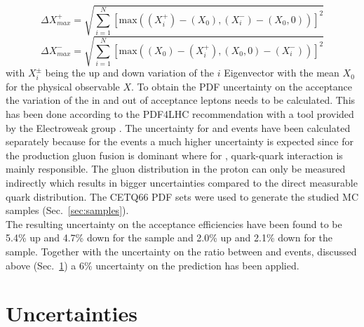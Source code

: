 \begin{equation}
 \Delta X_{max}^{+}=\sqrt{\sum_{i=1}^{N}[\text{max}((X_{i}^{+})-(X_{0}),(X_{i}^{-})-(X_{0},0))]^{2}}
\label{eq:MasterEquation1}
\end{equation}
\begin{equation}
 \Delta X_{max}^{-}=\sqrt{\sum_{i=1}^{N}[\text{max}((X_{0})-(X_{i}^{+}),(X_{0},0)-(X_{i}^{-}))]^{2}}
\label{eq:MasterEquation2}
\end{equation}
with $X_{i}^{\pm}$ being the up and down variation of the $i$ Eigenvector with the mean $X_0$ for the physical observable $X$. 
To obtain the PDF uncertainty on the acceptance the variation of the in and out of acceptance leptons needs to be calculated. This has been done according to the PDF4LHC recommendation with a tool provided by the Electroweak group \cite{electroweak:2010}.
The uncertainty for \ttbar and \wpj events have been calculated separately because for the \ttbar events a much higher uncertainty is expected since for the production gluon fusion is dominant where for \wpj, quark-quark interaction is mainly responsible. The gluon distribution in the proton can only be measured indirectly which results in bigger uncertainties compared to the direct measurable quark distribution\cite{bib:HERA:pdf}.
The CETQ66 PDF sets\cite{bib:cteq:web} were used to generate the studied MC samples (Sec.~\ref{sec:samples}).\\
The resulting uncertainty on the acceptance efficiencies have been found to be 5.4\% up and 4.7\% down for the \ttbar sample and 2.0\% up and 2.1\% down for the \wpj sample. Together with the uncertainty on the ratio between \wpj and \ttbar events, discussed above (Sec.~\ref{sec:uncertainties}) a $6\%$ uncertainty on the prediction has been applied. 




\section{Uncertainties}
\label{sec:uncertainties}

